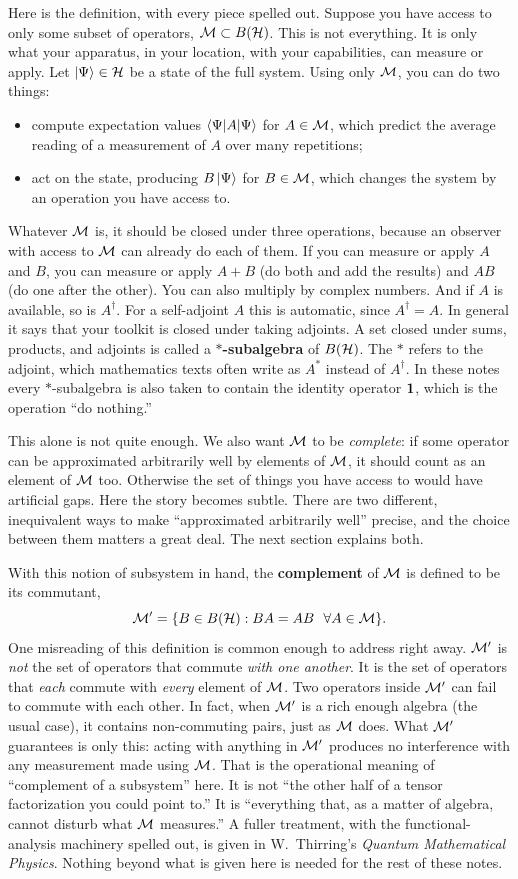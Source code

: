 Here is the definition, with every piece spelled out. Suppose you have access to only some subset of
operators, $\mathcal{M}\subset B(\mathcal{H})$. This is not everything. It is only what your apparatus, in your location, with
your capabilities, can measure or apply. Let $\ket\Psi\in\mathcal{H}$ be a state of the full system. Using only $\mathcal{M}$,
you can do two things:
\begin{itemize}
\item compute expectation values $\braket{\Psi|A|\Psi}$ for $A\in\mathcal{M}$, which predict the average reading of a
measurement of $A$ over many repetitions;
\item act on the state, producing $B\ket\Psi$ for $B\in\mathcal{M}$, which changes the system by an operation you have
access to.
\end{itemize}
Whatever $\mathcal{M}$ is, it should be closed under three operations, because an observer with access to $\mathcal{M}$ can
already do each of them. If you can measure or apply $A$ and $B$, you can measure or apply $A+B$ (do both and
add the results) and $AB$ (do one after the other). You can also multiply by complex numbers. And if $A$ is
available, so is $A^\dagger$. For a self-adjoint $A$ this is automatic, since $A^\dagger=A$. In general it
says that your toolkit is closed under taking adjoints. A set closed under sums, products, and adjoints is
called a \textbf{$*$-subalgebra} of $B(\mathcal{H})$. The $*$ refers to the adjoint, which mathematics texts often
write as $A^*$ instead of $A^\dagger$. In these notes every $*$-subalgebra is also taken to contain the identity
operator $\mathbf{1}$, which is the operation ``do nothing.''

This alone is not quite enough. We also want $\mathcal{M}$ to be \emph{complete}: if some operator can be approximated
arbitrarily well by elements of $\mathcal{M}$, it should count as an element of $\mathcal{M}$ too. Otherwise the set of things
you have access to would have artificial gaps. Here the story becomes subtle. There are two different,
inequivalent ways to make ``approximated arbitrarily well'' precise, and the choice between them matters a
great deal. The next section explains both.

With this notion of subsystem in hand, the \textbf{complement} of $\mathcal{M}$ is defined to be its commutant,
\[
\mathcal{M}' = \{B\in B(\mathcal{H}) : BA=AB\ \ \forall A\in\mathcal{M}\} .
\]
One misreading of this definition is common enough to address right away. $\mathcal{M}'$ is \emph{not} the set of
operators that commute \emph{with one another}. It is the set of operators that \emph{each} commute with
\emph{every} element of $\mathcal{M}$. Two operators inside $\mathcal{M}'$ can fail to commute with each other. In fact, when
$\mathcal{M}'$ is a rich enough algebra (the usual case), it contains non-commuting pairs, just as $\mathcal{M}$ does. What
$\mathcal{M}'$ guarantees is only this: acting with anything in $\mathcal{M}'$ produces no interference with any measurement
made using $\mathcal{M}$. That is the operational meaning of ``complement of a subsystem'' here. It is not ``the other
half of a tensor factorization you could point to.'' It is ``everything that, as a matter of algebra, cannot
disturb what $\mathcal{M}$ measures.'' A fuller treatment, with the functional-analysis machinery spelled out, is given
in W.~Thirring's \emph{Quantum Mathematical Physics}. Nothing beyond what is given here is needed for the rest
of these notes.

